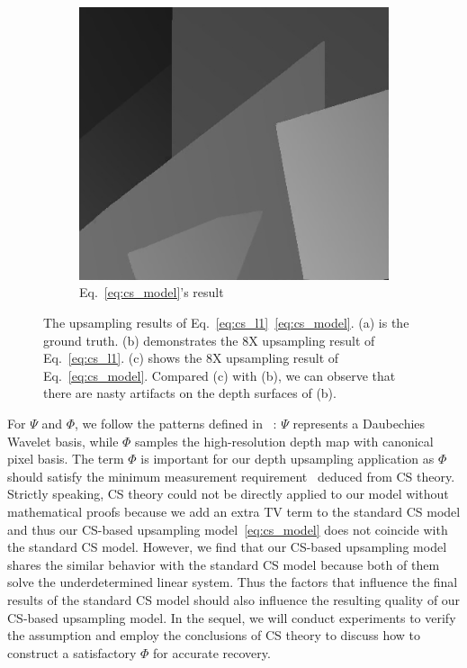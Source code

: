 \documentclass[preprint,10pt,5p,times,twocolumn]{elsarticle}
\begin{document}
\begin{figure}
\begin{subfigure}[b]{0.32\linewidth}
\end{subfigure}
\begin{subfigure}[b]{0.32\linewidth}
\includegraphics[width=\textwidth]{poster_2.png}
\caption{Eq.~\eqref{eq:cs_model}'s result}
\label{fig:cs_model}
\end{subfigure}
\caption{The upsampling results of Eq.~\eqref{eq:cs_l1}~\eqref{eq:cs_model}. (a) is the ground truth. (b) demonstrates the 8X upsampling result of Eq.~\eqref{eq:cs_l1}. (c) shows the 8X upsampling result of Eq.~\eqref{eq:cs_model}. Compared (c) with (b), we can observe that there are nasty artifacts on the depth surfaces of (b). }
\end{figure}

For $\Psi$ and $\Phi$, we follow the patterns defined in ~\cite{HKD11}: $\Psi$ represents a Daubechies Wavelet basis, while $\Phi$ samples the high-resolution depth map with canonical pixel basis. The term $\Phi$ is important for our depth upsampling application as $\Phi$ should satisfy the minimum measurement requirement~\cite{CR07} deduced from CS theory.  Strictly speaking, CS theory could not be directly applied to our model without mathematical proofs because we add an extra TV term to the standard CS model and thus our CS-based upsampling model~\eqref{eq:cs_model} does not coincide with the standard CS model. However, we find that our CS-based upsampling model shares the similar behavior with the standard CS model because both of them solve the underdetermined linear system. Thus the factors that influence the final results of the standard CS model should also influence the resulting quality of our CS-based upsampling model. In the sequel, we will conduct experiments to verify the assumption and employ the conclusions of CS theory to discuss how to construct a satisfactory $\Phi$ for accurate recovery.
\end{document}
